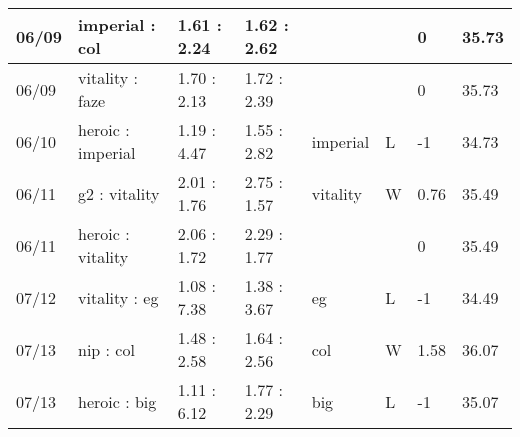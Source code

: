 \begin{small}
\begin{longtable}{|l|l|l|l|l|l|l|l|}
	06/09                               & imperial : col                      & 1.61 : 2.24                             & 1.62 : 2.62                             &                                   &                                   & 0                                    & 35.73                             \\ \hline
	06/09                               & vitality : faze                     & 1.70 : 2.13                             & 1.72 : 2.39                             &                                   &                                   & 0                                    & 35.73                             \\ \hline
	06/10                               & heroic : imperial                   & 1.19 : 4.47                             & 1.55 : 2.82                             & imperial                          & L                                 & -1                                   & 34.73                             \\ \hline
	06/11                               & g2 : vitality                       & 2.01 : 1.76                             & 2.75 : 1.57                             & vitality                          & W                                 & 0.76                                 & 35.49                             \\ \hline
	06/11                               & heroic : vitality                   & 2.06 : 1.72                             & 2.29 : 1.77                             &                                   &                                   & 0                                    & 35.49                             \\ \hline
	07/12                               & vitality : eg                       & 1.08 : 7.38                             & 1.38 : 3.67                             & eg                                & L                                 & -1                                   & 34.49                             \\ \hline
	07/13                               & nip : col                           & 1.48 : 2.58                             & 1.64 : 2.56                             & col                               & W                                 & 1.58                                 & 36.07                             \\ \hline
	07/13                               & heroic : big                        & 1.11 : 6.12                             & 1.77 : 2.29                             & big                               & L                                 & -1                                   & 35.07                             \\ \hline

\end{longtable}
\end{small}
